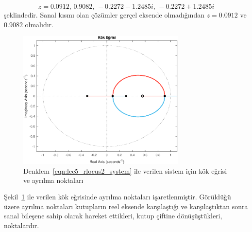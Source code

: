 \begin{enumerate}
    \begin{equation}
        z=0.0912,\,0.9082,\,-0.2272 - 1.2485i,\,-0.2272 + 1.2485i
    \end{equation}
    şeklindedir. Sanal kısmı olan çözümler gerçel eksende olmadığından $z=0.0912$ ve $0.9082$ olmalıdır.
    \begin{figure}[!htb]
        \centering
        \includegraphics[width=0.75\textwidth]{img/lec5_rlocus3}
        \caption{Denklem~\ref{eqn:lec5_rlocus2_system} ile verilen sistem için kök eğrisi ve ayrılma noktaları}
        \label{fig:lec5_rlocus3}
    \end{figure}
    Şekil~\ref{fig:lec5_rlocus3} ile verilen kök eğrisinde ayrılma noktaları işaretlenmiştir. Görüldüğü üzere ayrılma noktaları kutupların reel eksende karşılaştığı ve karşılaştıktan sonra sanal bileşene sahip olarak hareket ettikleri, kutup çiftine dönüşüştükleri, noktalardır.
\end{enumerate}